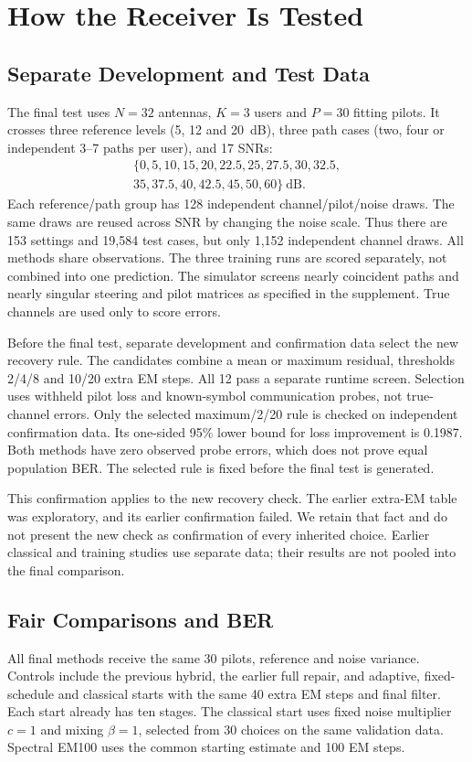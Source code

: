 \section{How the Receiver Is Tested}
\label{sec:protocol}
\subsection{Separate Development and Test Data}
The final test uses $N=32$ antennas, $K=3$ users and $P=30$ fitting pilots. It crosses three reference levels (5, 12 and 20~dB), three path cases (two, four or independent 3--7 paths per user), and 17 SNRs:
\begin{equation*}
 \begin{gathered}
 \{0,5,10,15,20,22.5,25,27.5,30,32.5,\\
 35,37.5,40,42.5,45,50,60\}\ \mathrm{dB}.
 \end{gathered}
\end{equation*}
Each reference/path group has 128 independent channel/pilot/noise draws. The same draws are reused across SNR by changing the noise scale. Thus there are 153 settings and 19,584 test cases, but only 1,152 independent channel draws. All methods share observations. The three training runs are scored separately, not combined into one prediction. The simulator screens nearly coincident paths and nearly singular steering and pilot matrices as specified in the supplement. True channels are used only to score errors.

Before the final test, separate development and confirmation data select the new recovery rule. The candidates combine a mean or maximum residual, thresholds 2/4/8 and 10/20 extra EM steps. All 12 pass a separate runtime screen. Selection uses withheld pilot loss and known-symbol communication probes, not true-channel errors. Only the selected maximum/2/20 rule is checked on independent confirmation data. Its one-sided 95\% lower bound for loss improvement is 0.1987. Both methods have zero observed probe errors, which does not prove equal population BER. The selected rule is fixed before the final test is generated.

This confirmation applies to the new recovery check. The earlier extra-EM table was exploratory, and its earlier confirmation failed. We retain that fact and do not present the new check as confirmation of every inherited choice. Earlier classical and training studies use separate data; their results are not pooled into the final comparison.

\subsection{Fair Comparisons and BER}
All final methods receive the same 30 pilots, reference and noise variance. Controls include the previous hybrid, the earlier full repair, and adaptive, fixed-schedule and classical starts with the same 40 extra EM steps and final filter. Each start already has ten stages. The classical start uses fixed noise multiplier $c=1$ and mixing $\beta=1$, selected from 30 choices on the same validation data. Spectral EM100 uses the common starting estimate and 100 EM steps.

